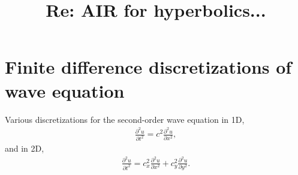 \documentclass[12pt]{article}
\title{Re: AIR for hyperbolics...}
\begin{document}
\maketitle



\section{Finite difference discretizations of wave equation }
Various discretizations for the second-order wave equation in 1D,
\begin{align}
\frac{\partial^2 u}{\partial t^2} = c^2 \frac{\partial^2 u}{\partial x^2},
\end{align}
and in 2D,
\begin{align}
\frac{\partial^2 u}{\partial t^2} = c_x^2 \frac{\partial^2 u}{\partial x^2} + c_y^2 \frac{\partial^2 u}{\partial y^2}.
\end{align}



\end{document}
